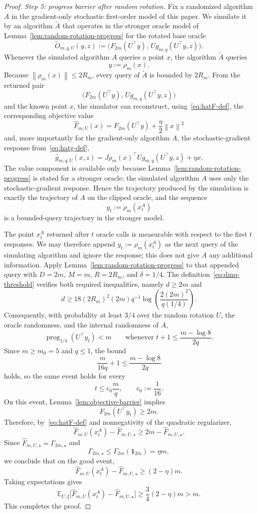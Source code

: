 \documentclass[11pt]{article}
\newcommand{\E}{\mathbb{E}}
\newcommand{\norm}[1]{\left\lVert #1\right\rVert}
\newcommand{\prog}{\operatorname{prog}}
\newcommand{\one}{\mathbf{1}}
\begin{document}
\begin{proof}
\emph{Step 5: progress barrier after random rotation.}
Fix a randomized algorithm $A$ in the gradient-only stochastic first-order model of this paper.
We simulate it by an algorithm $\widetilde A$ that operates in the stronger oracle model of Lemma~\ref{lem:random-rotation-progress} for the rotated base oracle
\[
\widetilde O_{m,q,U}(y,z):=\bigl(F_{2m}(U^\top y),\, Ug_{m,q}(U^\top y,z)\bigr).
\]
Whenever the simulated algorithm $A$ queries a point $x$, the algorithm $\widetilde A$ queries
\[
y:=\rho_m(x).
\]
Because $\norm{\rho_m(x)}\le 2R_m$, every query of $\widetilde A$ is bounded by $2R_m$.
From the returned pair
\[
\bigl(F_{2m}(U^\top y),\, Ug_{m,q}(U^\top y,z)\bigr)
\]
and the known point $x$, the simulator can reconstruct, using~\eqref{eq:hatF-def}, the corresponding objective value
\[
\widehat F_{m,U}(x)=F_{2m}(U^\top y)+\frac{\eta}{2}\norm{x}^2
\]
and, more importantly for the gradient-only algorithm \(A\), the stochastic-gradient response from~\eqref{eq:hatg-def},
\[
\widehat g_{m,q,U}(x,z)=J\rho_m(x)^\top Ug_{m,q}(U^\top y,z)+\eta x.
\]
The value component is available only because Lemma~\ref{lem:random-rotation-progress} is stated for a stronger oracle;
the simulated algorithm \(A\) uses only the stochastic-gradient response. Hence the trajectory produced by the simulation
is exactly the trajectory of $A$ on the clipped oracle, and the sequence
\[
y_t:=\rho_m(x_t^A)
\]
is a bounded-query trajectory in the stronger model.

The point \(x_t^A\) returned after \(t\) oracle calls is measurable with respect to the first \(t\) responses. We may
therefore append \(y_t:=\rho_m(x_t^A)\) as the next query of the simulating algorithm and ignore the response; this does
not give \(A\) any additional information. Apply Lemma~\ref{lem:random-rotation-progress} to that appended query with
$D=2m$, $M=m$, $R=2R_m$, and $\delta=1/4$.
The definition~\eqref{eq:dmq-threshold} verifies both required inequalities, namely $d\ge2m$ and
\[
d\ge18(2R_m)^2(2m)q^{-1}
\log\left(\frac{2(2m)^2}{q(1/4)}\right).
\]
Consequently, with probability at least $3/4$ over the random rotation $U$, the oracle randomness, and the internal
randomness of $A$,
\[
\prog_{1/4}(U^\top y_t)<m
\qquad
\text{whenever }t+1\le \frac{m-\log 8}{2q}.
\]
Since $m\ge m_0=5$ and $q\le1$, the bound
\[
\frac{m}{16q}+1\le \frac{m-\log 8}{2q}
\]
holds, so the same event holds for every
\[
t\le c_0\frac{m}{q},
\qquad
c_0:=\frac1{16}.
\]
On this event, Lemma~\ref{lem:objective-barrier} implies
\[
F_{2m}(U^\top y_t)\ge 2m.
\]
Therefore, by~\eqref{eq:hatF-def} and nonnegativity of the quadratic regularizer,
\[
\widehat F_{m,U}(x_t^A)-\widehat F_{m,U,\star}\ge 2m-\widehat F_{m,U,\star}.
\]
Since $\widehat F_{m,U,\star}=\Gamma_{2m,\star}$ and
\[
\Gamma_{2m,\star}\le \Gamma_{2m}(\one_{2m})=\eta m,
\]
we conclude that on the good event,
\[
\widehat F_{m,U}(x_t^A)-\widehat F_{m,U,\star}\ge (2-\eta)m.
\]
Taking expectations gives
\[
\E_{U,\xi}\bigl[\widehat F_{m,U}(x_t^A)-\widehat F_{m,U,\star}\bigr]
\ge
\frac34(2-\eta)m>m.
\]
This completes the proof.
\end{proof}
\end{document}
